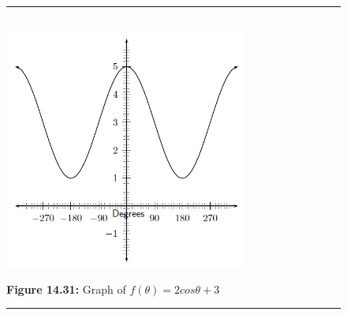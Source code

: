\begin{figure}[H] %
\begin{center}
\rule[.1in]{\figurerulewidth}{.005in} \\
\label{m39414*uid52!!!underscore!!!media}\label{m39414*uid52!!!underscore!!!printimage}\includegraphics[width=300px]{col11306.imgs/m39414_trigrep1.png} %
\vspace{2pt}
\vspace{\rubberspace}\par \begin{cnxcaption}
\small \textbf{Figure 14.31: }Graph of $f\left(\theta \right)=2cos\theta +3$
\end{cnxcaption}
\vspace{.1in}
\rule[.1in]{\figurerulewidth}{.005in} \\
\end{center}
\end{figure}       
\label{m39414*secfhsst!!!underscore!!!id2647}
\nopagebreak
